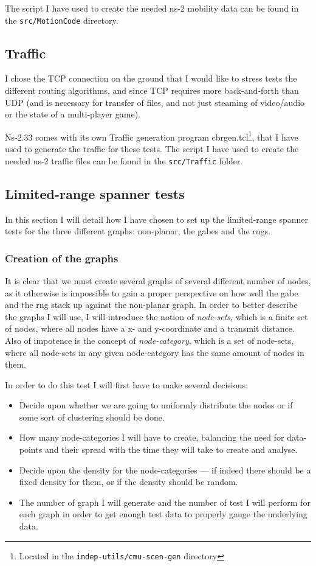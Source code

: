 The script I have used to create the needed ns-2 mobility data can be found in the \texttt{src/MotionCode} directory.

\subsection{Traffic}
I chose the TCP connection on the ground that I would like to stress tests the different routing algorithms, and since TCP requires more back-and-forth than UDP (and is necessary for transfer of files, and not just steaming of video/audio or the state of a multi-player game).

Ns-2.33 comes with its own Traffic generation program cbrgen.tcl\footnote{Located in the \texttt{indep-utils/cmu-scen-gen} directory}, that I have used to generate the traffic for these tests. The script I have used to create the needed ns-2 traffic files can be found in the \texttt{src/Traffic} folder.

\subsection{Limited-range spanner tests}
\label{section:test_desc_spanners}
In this section I will detail how I have chosen to set up the limited-range spanner tests for the three different graphs: non-planar, the \acp{gabe} and the \acp{rng}.

\subsubsection{Creation of the graphs}
It is clear that we must create several graphs of several different number of nodes, as it otherwise is impossible to gain a proper perspective on how well the \ac{gabe} and the \ac{rng} stack up against the non-planar graph. In order to better describe the graphs I will use, I will introduce the notion of \emph{node-sets}, which is a finite set of nodes, where all nodes have a x- and y-coordinate and a transmit distance. Also of impotence is the concept of \emph{node-category}, which is a set of node-sets, where all node-sets in any given node-category has the same amount of nodes in them. 

In order to do this test I will first have to make several decisions:
\begin{itemize}
\item Decide upon whether we are going to uniformly distribute the nodes or if some sort of clustering should be done. 
\item How many node-categories I will have to create, balancing the need for data-points and their spread with the time they will take to create and analyse.
\item Decide upon the density for the node-categories --- if indeed there should be a fixed density for them, or if the density should be random.
\item The number of graph I will generate and the number of test I will perform for each graph in order to get enough test data to properly gauge the underlying data.
\end{itemize}


